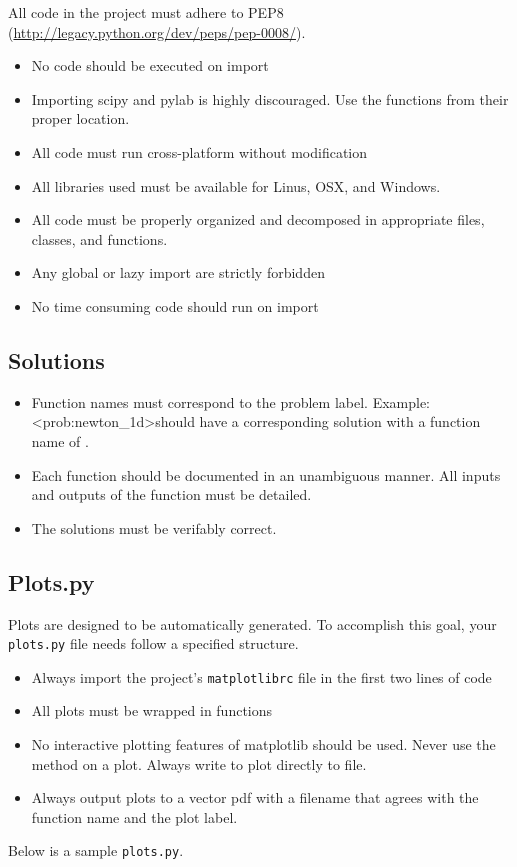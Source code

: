 All code in the project must adhere to PEP8 (\url{http://legacy.python.org/dev/peps/pep-0008/}).

\begin{itemize}
\item No code should be executed on import
\item Importing scipy and pylab is highly discouraged.  Use the functions from their proper location.
\item All code must run cross-platform without modification
\item All libraries used must be available for Linus, OSX, and Windows.
\item All code must be properly organized and decomposed in appropriate files, classes, and functions.
\item Any global or lazy import are strictly forbidden
\item No time consuming code should run on import
\end{itemize}

\subsection{Solutions}
\begin{itemize}
\item Function names must correspond to the problem label.  Example: \textless prob:newton\_1d\textgreater should have a corresponding solution with a function name of .
\item Each function should be documented in an unambiguous manner.  All inputs and outputs of the function must be detailed.
\item The solutions must be verifably correct.
\end{itemize}

\subsection{Plots.py}
Plots are designed to be automatically generated.
To accomplish this goal, your \texttt{plots.py} file needs follow a specified structure.
\begin{itemize}
\item Always import the project's \texttt{matplotlibrc} file in the first two lines of code
\item All plots must be wrapped in functions
\item No interactive plotting features of matplotlib should be used.  Never use the  method on a plot.  Always write to plot directly to file.
\item Always output plots to a vector pdf with a filename that agrees with the function name and the plot label.
\end{itemize}
Below is a sample \texttt{plots.py}.




